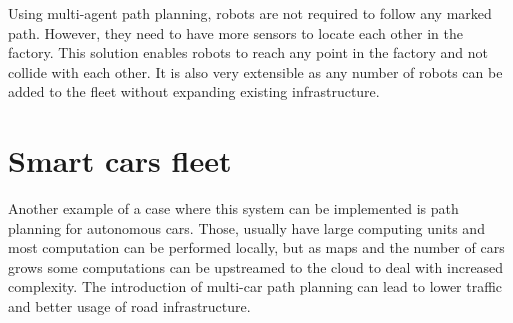 Using multi-agent path planning, robots are not required to follow any marked path. However, they need to have more sensors to locate each other in the factory. This solution enables robots to reach any point in the factory and not collide with each other. It is also very extensible as any number of robots can be added to the fleet without expanding existing infrastructure.

\section{Smart cars fleet}

Another example of a case where this system can be implemented is path planning for autonomous cars. Those, usually have large computing units and most computation can be performed locally, but as maps and the number of cars grows some computations can be upstreamed to the cloud to deal with increased complexity. The introduction of multi-car path planning can lead to lower traffic and better usage of road infrastructure.